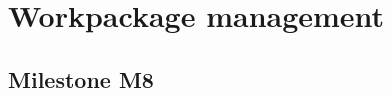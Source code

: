 \documentclass{beamer}
\begin{document}
    


\section{Workpackage management}

\subsection{Milestone M8}

\end{document}
